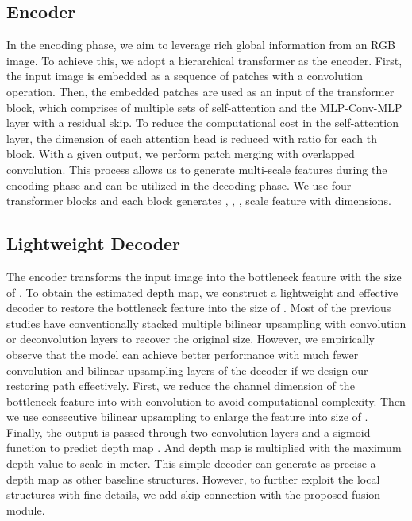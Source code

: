 \documentclass{article}
\begin{document}
\subsection{Encoder}
In the encoding phase, we aim to leverage rich global information from an RGB image. 
To achieve this, we adopt a hierarchical transformer as the encoder.
First, the input image  is embedded as a sequence of patches with a  convolution operation. 
Then, the embedded patches are used as an input of the transformer block, which comprises of multiple sets of self-attention and the MLP-Conv-MLP layer with a residual skip. 
To reduce the computational cost in the self-attention layer, the dimension of each attention head is reduced with ratio  for each th block. 
With a given output, we perform patch merging with overlapped convolution. 
This process allows us to generate multi-scale features during the encoding phase and can be utilized in the decoding phase. 
We use four transformer blocks and each block generates , , ,  scale feature with  dimensions. 


\subsection{Lightweight Decoder} The encoder transforms the input image  into the bottleneck feature  with the size of . To obtain the estimated depth map, we construct a lightweight and effective decoder to restore the bottleneck feature into the size of . 
Most of the previous studies have conventionally stacked multiple bilinear upsampling with convolution or deconvolution layers to recover the original size. 
However, we empirically observe that the model can achieve better performance with much fewer convolution and bilinear upsampling layers of the decoder if we design our restoring path effectively. 
First, we reduce the channel dimension of the bottleneck feature into  with  convolution to avoid computational complexity. 
Then we use consecutive bilinear upsampling to enlarge the feature into size of . 
Finally, the output is passed through two convolution layers and a sigmoid function to predict depth map . 
And depth map is multiplied with the maximum depth value to scale in meter. 
This simple decoder can generate as precise a depth map as other baseline structures.
However, to further exploit the local structures with fine details, we add skip connection with the proposed fusion module.
\end{document}
